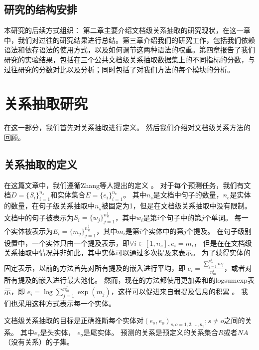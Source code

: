 \documentclass[bachelor]{thesis-uestc}
\begin{document}
\section{研究的结构安排}
本研究的后续方式组织： 第二章主要介绍文档级关系抽取的研究现状，在这一章中，我们对过往的研究结果进行总结。第三章介绍我们的研究工作，包括我们依赖语法和依存语法的使用方式，以及如何调节这两种语法的权重。第四章报告了我们研究的实验结果，包括在三个公共文档级关系抽取数据集上的不同指标的分数，与过往研究的分数对比以及分析；同时包括了对我们方法的每个模块的分析。

\chapter{关系抽取研究}
在这一部分，我们首先对关系抽取进行定义。
然后我们介绍对文档级关系方法的回顾。
\section{关系抽取的定义}

在这篇文章中，我们遵循Zhang等人提出的定义 \cite{zhang-etal-2020-document}。
对于每个预测任务，我们有文档$D=\{S_i\}_{i=1}^{n_s}$和实体集合$E=\{e_i\}_{i=1}^{n_e}$。
其中$n_s$是文档中句子的数量，$n_e$是实体的数量，在句子级关系抽取中$n_s$被固定为1，但是在文档级关系抽取中没有限制。
文档中的句子被表示为$S_i=\{w_j\}_{j=1}^{n_w^j}$，其中$w_i$是第$i$个句子中的第$j$个单词。
每一个实体被表示为$E_i=\{m_j\}_{j=1}^{n_w^j}$，其中$m_i$是第$i$个实体中的第$j$个提及。
在句子级别设置中，一个实体只由一个提及表示，即$\forall i \in [1, n_e], e_i = m_i$， 但是在在文档级关系抽取中情况并非如此，其中实体可以通过多次提及来表示。
为了获得实体的固定表示，以前的方法首先对所有提及的嵌入进行平均，即 $e_i = \frac{\sum_{j=1}^{n_m^j} m_j}{n_m^i}$，或者对所有提及的嵌入进行最大池化。
然而，现在的方法都使用更加柔和的logsumexp表示，即 $e_i = \log \sum_{j=1}^{n_m^j} \exp(m_j)$，这样可以促进来自弱提及信息的积累 \cite{jia-etal-2019-document}。
我们也采用这种方式表示每一个实体。\par

文档级关系抽取的目标是正确推断每个实体对$(e_s,e_o)_{s,o = 1, 2, \dots, n_e}; s \neq o$之间的关系。
其中$e_s$是头实体， $e_o$是尾实体。
预测的关系是预定义的关系集合$R$或者$NA$（没有关系）的子集。
\end{document}
